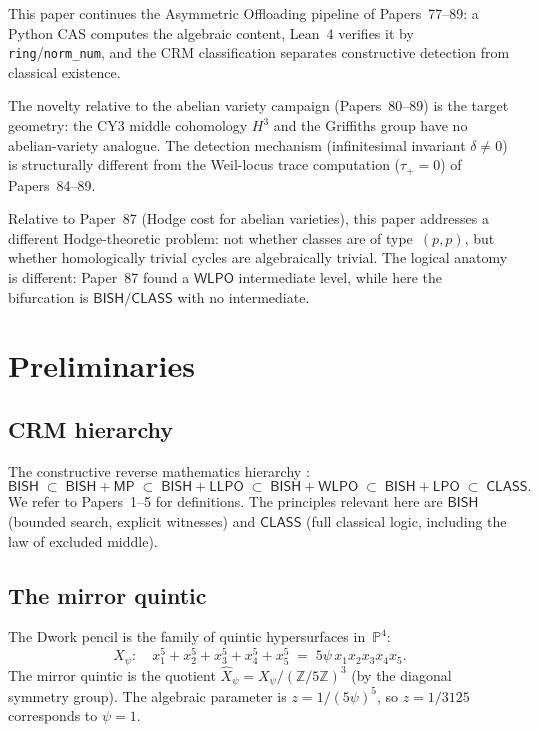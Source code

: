\documentclass[11pt]{article}
\theoremstyle{plain}
\theoremstyle{definition}
\theoremstyle{remark}
\newcommand{\Z}{\mathbb{Z}}
\newcommand{\PP}{\mathbb{P}}
\newcommand{\BISH}{\ensuremath{\mathsf{BISH}}}
\newcommand{\LPO}{\ensuremath{\mathsf{LPO}}}
\newcommand{\WLPO}{\ensuremath{\mathsf{WLPO}}}
\newcommand{\LLPO}{\ensuremath{\mathsf{LLPO}}}
\newcommand{\MP}{\ensuremath{\mathsf{MP}}}
\newcommand{\CLASS}{\ensuremath{\mathsf{CLASS}}}
\begin{document}
This paper continues the Asymmetric Offloading pipeline of Papers~77--89: a Python CAS computes the algebraic content, Lean~4 verifies it by \texttt{ring}/\texttt{norm\_num}, and the CRM classification separates constructive detection from classical existence.

The novelty relative to the abelian variety campaign (Papers~80--89) is the target geometry: the CY3 middle cohomology $H^3$ and the Griffiths group have no abelian-variety analogue. The detection mechanism (infinitesimal invariant $\delta \neq 0$) is structurally different from the Weil-locus trace computation ($\tau_+ = 0$) of Papers~84--89.

Relative to Paper~87 (Hodge cost for abelian varieties), this paper addresses a different Hodge-theoretic problem: not whether classes are of type~$(p,p)$, but whether homologically trivial cycles are algebraically trivial. The logical anatomy is different: Paper~87 found a $\WLPO$ intermediate level, while here the bifurcation is $\BISH/\CLASS$ with no intermediate.


\section{Preliminaries}
\label{sec:prelim}

\subsection{CRM hierarchy}

The constructive reverse mathematics hierarchy \cite{bridges-richman,paper1,paper40}:
\[
\BISH \;\subset\; \BISH{+}\MP \;\subset\; \BISH{+}\LLPO \;\subset\; \BISH{+}\WLPO \;\subset\; \BISH{+}\LPO \;\subset\; \CLASS.
\]
We refer to Papers~1--5 for definitions. The principles relevant here are $\BISH$ (bounded search, explicit witnesses) and $\CLASS$ (full classical logic, including the law of excluded middle).

\subsection{The mirror quintic}

The Dwork pencil is the family of quintic hypersurfaces in~$\PP^4$:
\[
X_\psi: \quad x_1^5 + x_2^5 + x_3^5 + x_4^5 + x_5^5 \;=\; 5\psi\, x_1 x_2 x_3 x_4 x_5.
\]
The mirror quintic is the quotient $\widehat{X}_\psi = X_\psi / (\Z/5\Z)^3$ (by the diagonal symmetry group). The algebraic parameter is $z = 1/(5\psi)^5$, so $z = 1/3125$ corresponds to $\psi = 1$.
\end{document}
